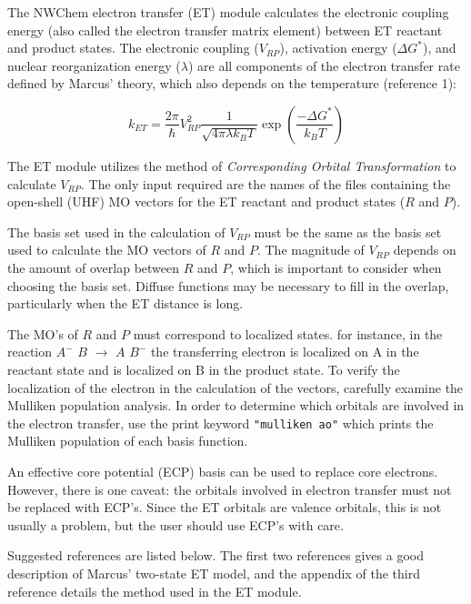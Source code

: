 %
%
\label{sec:etrans}

The NWChem electron transfer (ET) module calculates the electronic coupling energy (also called the electron transfer
matrix element) between ET reactant and product states.  The electronic coupling ($V_{RP}$), activation energy ($\Delta G^{*}$),
and nuclear reorganization energy ($\lambda$) are all components of the electron transfer rate defined by Marcus' theory, which
also depends on the temperature (reference 1):

\begin{equation}
{k_{ET}}=
\frac{2\pi}{\hbar}
V_{RP}^{2}
\frac{1}{\sqrt{4\pi \lambda k_{B}T}}
\exp \left( \frac{- \Delta G^{*}}{k_{B} T} \right)
\end{equation}

The ET module utilizes the method of {\em Corresponding Orbital Transformation} to calculate $V_{RP}$.
The only input required are the names
of the files containing the open-shell (UHF) MO vectors for the ET reactant and product states ($R$ and $P$).

The basis set used in the calculation of $V_{RP}$ must be the same as the basis set used to calculate the MO vectors of
$R$ and $P$.  The magnitude of $V_{RP}$ depends on the amount of overlap between $R$ and $P$,
which is important to consider when choosing the basis set.  Diffuse functions may be
necessary to fill in the overlap, particularly when the ET distance is long.

The MO's of $R$ and $P$ must correspond to localized states.  for instance, in the reaction $A^{ -}$ $B$ $\rightarrow$ $A$ $B^{ -}$
the transferring electron is localized on A in the reactant state and is localized on B in the product state.
To verify the localization of the electron in the calculation of the vectors, carefully examine the Mulliken population
analysis.  In order to determine which orbitals are involved in the electron transfer, use the print keyword \verb+"mulliken ao"+ 
which prints the Mulliken population of each basis function.

An effective core potential (ECP) basis can be used to replace core electrons.  However, there is one caveat: the orbitals
involved in electron transfer must not be replaced with ECP's.  Since the ET orbitals are valence orbitals, this is not usually
a problem, but the user should use ECP's with care.

Suggested references are listed below.  The first two references gives a good description 
of Marcus' two-state ET model, and the appendix of the third reference details the method used
in the ET module.

